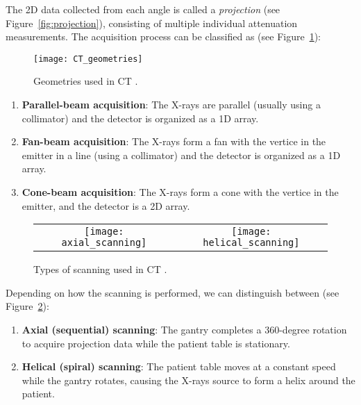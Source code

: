 The 2D data collected from each angle is called a \emph{projection}
(see Figure~\ref{fig:projection}), consisting of multiple individual
attenuation measurements. The acquisition process can be classified as
(see Figure~\ref{fig:CT_geometries}):

\begin{figure}
  \centering
  \texttt{[image: CT\_geometries]}
  \caption{Geometries used in CT \cite{takase2025CT}.\label{fig:CT_geometries}}
\end{figure}

\begin{enumerate}
\item \textbf{Parallel-beam acquisition}: The X-rays are parallel
  (usually using a collimator) and the detector is organized as a 1D
  array.

\item \textbf{Fan-beam acquisition}: The X-rays form a fan with the vertice in the emitter
  in a line (using a collimator) and the detector is organized as a 1D
  array.

\item \textbf{Cone-beam acquisition}: The X-rays form a cone with the
  vertice in the emitter, and the detector is a 2D array.
  
\end{enumerate}

\begin{figure}
  \centering
  \begin{tabular}{cc}
    \texttt{[image: axial\_scanning]} & \texttt{[image: helical\_scanning]}
  \end{tabular}
  \caption{Types of scanning used in CT \cite{abdulla2025acquiring1}.\label{fig:scannings}}
\end{figure}

Depending on how the scanning is performed, we can distinguish between
(see Figure~\ref{fig:scannings}):

\begin{enumerate}
\item \textbf{Axial (sequential) scanning}:
  The gantry completes a 360-degree rotation to acquire projection
  data while the patient table is stationary. 

\item \textbf{Helical (spiral) scanning}: The patient table moves
  at a constant speed while the gantry rotates, causing the X-rays
  source to form a helix around the patient.
\end{enumerate}


